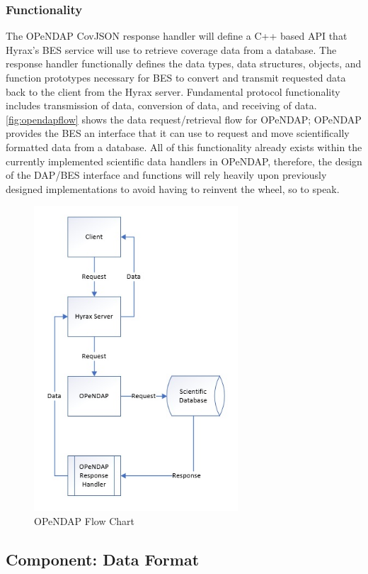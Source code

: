 \documentclass[onecolumn, draftclsnofoot,10pt, compsoc]{IEEEtran}
\begin{document}
\subsubsection{Functionality}
The OPeNDAP CovJSON response handler will define a C++ based API that Hyrax's BES service will use to retrieve coverage data from a database. The response handler functionally defines the data types, data structures, objects, and function prototypes necessary for BES to convert and transmit requested data back to the client from the Hyrax server. Fundamental protocol functionality includes transmission of data, conversion of data, and receiving of data. \autoref{fig:opendapflow} shows the data request/retrieval flow for OPeNDAP; OPeNDAP provides the BES an interface that it can use to request and move scientifically formatted data from a database. All of this functionality already exists within the currently implemented scientific data handlers in OPeNDAP, therefore, the design of the DAP/BES interface and functions will rely heavily upon previously designed implementations to avoid having to reinvent the wheel, so to speak.
\begin{figure}[H]
    \centering
    \includegraphics[width=3in,scale=0.75]{OPeNDAP_flow_chart.jpg}
    \caption{OPeNDAP Flow Chart}
    \label{fig:opendapflow}
\end{figure}
\subsection{Component: Data Format}
\end{document}
